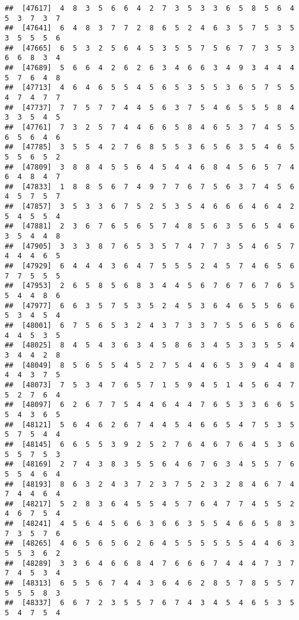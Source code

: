 \documentclass[
]{book}
\begin{document}
\begin{verbatim}
##  [47617]  4  8  3  5  6  6  4  2  7  3  5  3  3  6  5  8  5  6  4  5  3  7  3  7
##  [47641]  6  4  8  3  7  7  2  8  6  5  2  4  6  3  5  7  5  3  5  3  5  5  5  6
##  [47665]  6  5  3  2  5  6  4  5  3  5  5  7  5  6  7  7  3  5  3  6  6  8  3  4
##  [47689]  5  6  6  4  2  6  2  6  3  4  6  6  3  4  9  3  4  4  4  5  7  6  4  8
##  [47713]  4  6  4  6  5  5  4  5  6  5  3  5  5  3  6  5  7  5  5  4  7  4  7  7
##  [47737]  7  7  5  7  7  4  4  5  6  3  7  5  4  6  5  5  5  8  4  3  3  5  4  5
##  [47761]  7  3  2  5  7  4  4  6  6  5  8  4  6  5  3  7  4  5  5  6  5  6  4  6
##  [47785]  3  5  5  4  2  7  6  8  5  5  3  6  5  6  3  5  4  6  5  5  5  6  5  2
##  [47809]  3  8  8  4  5  5  6  4  5  4  4  6  8  4  5  6  5  7  4  6  4  8  4  7
##  [47833]  1  8  8  5  6  7  4  9  7  7  6  7  5  6  3  7  4  5  6  4  5  7  5  7
##  [47857]  3  5  3  3  6  7  5  2  5  3  5  4  6  6  6  4  6  4  2  5  4  5  5  4
##  [47881]  2  3  6  7  6  5  6  5  7  4  8  5  6  3  5  6  5  4  6  3  5  4  4  8
##  [47905]  3  3  3  8  7  6  5  3  5  7  4  7  7  3  5  4  6  5  7  4  4  4  6  5
##  [47929]  6  4  4  4  3  6  4  7  5  5  5  2  4  5  7  4  6  5  6  7  7  5  5  5
##  [47953]  2  6  5  8  5  6  8  3  4  4  5  6  7  6  7  6  7  6  5  5  4  4  8  6
##  [47977]  6  6  3  5  7  5  3  5  2  4  5  3  6  4  6  5  5  6  6  5  3  4  5  4
##  [48001]  6  7  5  6  5  3  2  4  3  7  3  3  7  5  5  6  5  6  6  4  4  5  3  5
##  [48025]  8  4  5  4  3  6  3  4  5  8  6  3  4  5  3  3  5  5  4  3  4  4  2  8
##  [48049]  8  5  6  5  5  4  5  2  7  5  4  4  6  5  3  9  4  4  8  4  4  3  7  5
##  [48073]  7  5  3  4  7  6  5  7  1  5  9  4  5  1  4  5  6  4  7  5  2  7  6  4
##  [48097]  6  2  6  7  7  5  4  4  6  4  4  7  6  5  3  3  6  6  5  5  4  3  6  5
##  [48121]  5  6  4  6  2  6  7  4  4  5  4  6  6  5  4  7  5  3  5  5  7  5  4  4
##  [48145]  6  6  5  5  3  9  2  5  2  7  6  4  6  7  6  4  5  3  6  5  5  7  5  3
##  [48169]  2  7  4  3  8  3  5  5  6  4  6  7  6  3  4  5  5  7  6  5  5  4  6  4
##  [48193]  8  6  3  2  4  3  7  2  3  7  5  2  3  2  8  4  6  7  4  7  4  4  6  4
##  [48217]  5  2  8  3  6  4  5  5  4  5  7  6  4  7  7  4  5  5  2  4  6  7  5  4
##  [48241]  4  5  6  4  5  6  6  3  6  6  3  5  5  4  6  6  5  8  3  7  3  5  7  6
##  [48265]  4  6  5  6  5  6  2  6  4  5  5  5  5  5  5  4  4  6  3  5  5  3  6  2
##  [48289]  3  3  6  4  6  6  8  4  7  6  6  6  7  4  4  4  7  3  7  7  4  5  3  4
##  [48313]  6  5  5  6  7  4  4  3  6  4  6  2  8  5  7  8  5  5  7  5  5  5  8  3
##  [48337]  6  6  7  2  3  5  5  7  6  7  4  3  4  5  4  6  5  3  5  5  4  7  5  4

\end{verbatim}
\end{document}
